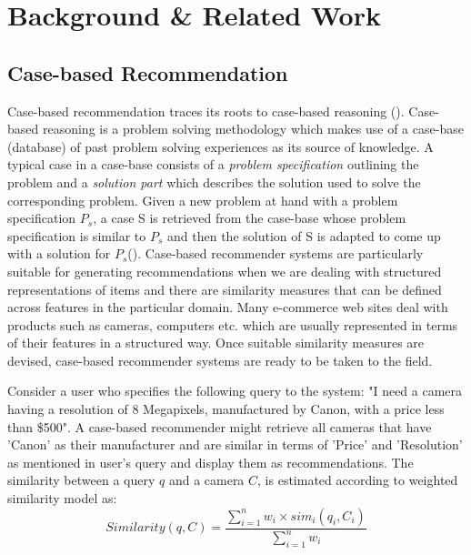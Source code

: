 \chapter{Background \& Related Work}
\label{chap:background}

\section{Case-based Recommendation}
Case-based recommendation traces its roots to case-based reasoning (\cite{aamodt94}).
Case-based reasoning is a problem solving methodology which makes use of a case-base (database) of past problem solving experiences as its source of knowledge. 
A typical case in a case-base consists of a \textit{problem specification} outlining the problem and a \textit{solution part} which describes the solution used to solve the corresponding problem.
Given a new problem at hand with a problem specification $P_s$, a case S is retrieved from the case-base whose problem specification is similar to $P_s$ and then the solution of S is adapted to come up with a solution for $P_s$(\cite{smyth2007}).
Case-based recommender systems are particularly suitable for generating recommendations when we are dealing with structured representations of items and there are similarity measures that can be defined across features in the particular domain. 
Many e-commerce web sites deal with products such as cameras, computers etc. which are usually represented in terms of their features in a structured way. 
Once suitable similarity measures are devised, case-based recommender systems are ready to be taken to the field.

Consider a user who specifies the following query to the system: "I need a camera having a resolution of 8 Megapixels, manufactured by Canon, with a price less than \$500".
A case-based recommender might retrieve all cameras that have 'Canon' as their manufacturer and are similar in terms of 'Price' and 'Resolution' as mentioned in user's query and display them as recommendations.
The similarity between a query $q$ and a camera $C$, is estimated according to weighted similarity model as:
\begin{equation}
\label{eq:sim}
Similarity(q, C) = \frac{\sum_{i=1}^{n}{w_i \times sim_i(q_i, C_i)}}{\sum_{i=1}^{n}w_i}
\end{equation}

